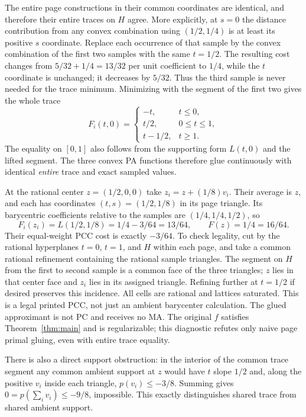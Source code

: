 \documentclass[11pt]{article}
\begin{document}
The entire page constructions in their common coordinates are identical, and therefore their entire traces on $H$ agree. More explicitly, at $s=0$ the distance contribution from any convex combination using $(1/2,1/4)$ is at least its positive $s$ coordinate. Replace each occurrence of that sample by the convex combination of the first two samples with the same $t=1/2$. The resulting cost changes from $5/32+1/4=13/32$ per unit coefficient to $1/4$, while the $t$ coordinate is unchanged; it decreases by $5/32$. Thus the third sample is never needed for the trace minimum. Minimizing with the segment of the first two gives the whole trace
\[
 F_i(t,0)=\begin{cases}-t,&t\leq0,\\t/2,&0\leq t\leq1,\\t-1/2,&t\geq1.\end{cases}
\]
The equality on $[0,1]$ also follows from the supporting form $L(t,0)$ and the lifted segment. The three convex PA functions therefore glue continuously with identical \emph{entire} trace and exact sampled values.

At the rational center $z=(1/2,0,0)$ take $z_i=z+(1/8)v_i$. Their average is $z$, and each has coordinates $(t,s)=(1/2,1/8)$ in its page triangle. Its barycentric coefficients relative to the samples are $(1/4,1/4,1/2)$, so
\[
 F_i(z_i)=L(1/2,1/8)=1/4-3/64=13/64,
 \qquad F(z)=1/4=16/64.
\]
Their equal-weight PCC cost is exactly $-3/64$. To check legality, cut by the rational hyperplanes $t=0$, $t=1$, and $H$ within each page, and take a common rational refinement containing the rational sample triangles. The segment on $H$ from the first to second sample is a common face of the three triangles; $z$ lies in that center face and $z_i$ lies in its assigned triangle. Refining further at $t=1/2$ if desired preserves this incidence. All cells are rational and lattices saturated. This is a legal printed PCC, not just an ambient barycenter calculation. The glued approximant is not PC and receives no MA. The original $f$ satisfies Theorem~\ref{thm:main} and is regularizable; this diagnostic refutes only naive page primal gluing, even with entire trace equality.

There is also a direct support obstruction: in the interior of the common trace segment any common ambient support at $z$ would have $t$ slope $1/2$ and, along the positive $v_i$ inside each triangle, $p(v_i)\leq-3/8$. Summing gives $0=p(\sum_iv_i)\leq-9/8$, impossible. This exactly distinguishes shared trace from shared ambient support.
\end{document}
